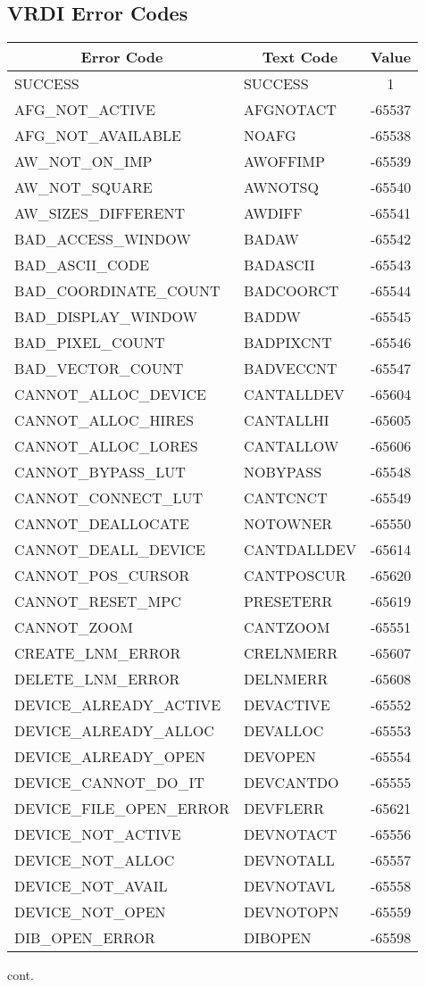 \subsection{VRDI Error Codes}
\begin{tabular}{|l|l|c|}
\hline
\multicolumn{1}{|c|}{Error Code}
&\multicolumn{1}{|c|}{Text Code}
&\multicolumn{1}{|c|}{Value}\\
\hline
SUCCESS & SUCCESS & 1\\
AFG\_NOT\_ACTIVE & AFGNOTACT & -65537\\
AFG\_NOT\_AVAILABLE & NOAFG & -65538\\
AW\_NOT\_ON\_IMP & AWOFFIMP & -65539\\
AW\_NOT\_SQUARE & AWNOTSQ & -65540\\
AW\_SIZES\_DIFFERENT & AWDIFF & -65541\\
BAD\_ACCESS\_WINDOW & BADAW & -65542\\
BAD\_ASCII\_CODE & BADASCII & -65543\\
BAD\_COORDINATE\_COUNT & BADCOORCT & -65544\\
BAD\_DISPLAY\_WINDOW & BADDW & -65545\\
BAD\_PIXEL\_COUNT & BADPIXCNT & -65546\\
BAD\_VECTOR\_COUNT & BADVECCNT & -65547\\
CANNOT\_ALLOC\_DEVICE & CANTALLDEV & -65604\\
CANNOT\_ALLOC\_HIRES & CANTALLHI & -65605\\
CANNOT\_ALLOC\_LORES & CANTALLOW & -65606\\
CANNOT\_BYPASS\_LUT & NOBYPASS & -65548\\
CANNOT\_CONNECT\_LUT & CANTCNCT & -65549\\
CANNOT\_DEALLOCATE & NOTOWNER & -65550\\
CANNOT\_DEALL\_DEVICE & CANTDALLDEV & -65614\\
CANNOT\_POS\_CURSOR & CANTPOSCUR & -65620\\
CANNOT\_RESET\_MPC & PRESETERR & -65619\\
CANNOT\_ZOOM & CANTZOOM & -65551\\
CREATE\_LNM\_ERROR & CRELNMERR & -65607\\
DELETE\_LNM\_ERROR & DELNMERR & -65608\\
DEVICE\_ALREADY\_ACTIVE & DEVACTIVE & -65552\\
DEVICE\_ALREADY\_ALLOC & DEVALLOC & -65553\\
DEVICE\_ALREADY\_OPEN & DEVOPEN & -65554\\
DEVICE\_CANNOT\_DO\_IT & DEVCANTDO & -65555\\
DEVICE\_FILE\_OPEN\_ERROR & DEVFLERR & -65621\\
DEVICE\_NOT\_ACTIVE & DEVNOTACT & -65556\\
DEVICE\_NOT\_ALLOC & DEVNOTALL & -65557\\
DEVICE\_NOT\_AVAIL & DEVNOTAVL & -65558\\
DEVICE\_NOT\_OPEN & DEVNOTOPN & -65559\\
DIB\_OPEN\_ERROR & DIBOPEN & -65598\\
\hline
\end{tabular}
\newpage
cont.


